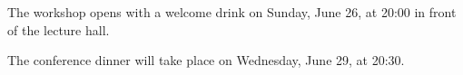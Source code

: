 \documentclass[12pt]{report}
\begin{document}
{}


{}


{}


{\large

\newpage
 \printindex }


\newpage
\thispagestyle{empty}



\vspace{0.5cm}

The workshop opens with a welcome drink on Sunday, June 26, at 20:00 in front of the lecture hall.

The conference dinner will take place on Wednesday, June 29, at 20:30.






\end{document}
